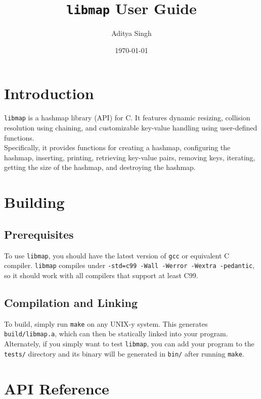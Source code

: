 \documentclass[titlepage]{article}
\title{\texttt{libmap} User Guide}
\author{Aditya Singh}
\date{\today}
\begin{document}
\maketitle
\tableofcontents
\newpage

\section{Introduction}
\texttt{libmap} is a hashmap library (API) for C. It features dynamic resizing, collision resolution using chaining,
and customizable key-value handling using user-defined functions.\\
Specifically, it provides functions for
creating a hashmap, configuring the hashmap, inserting, printing, retrieving key-value pairs, removing keys, iterating,
getting the size of the hashmap, and destroying the hashmap.
\\
\section{Building}
\subsection{Prerequisites}
To use \texttt{libmap}, you should have the latest version of
\texttt{gcc} or equivalent C compiler. \texttt{libmap} compiles under
\texttt{-std=c99 -Wall -Werror -Wextra -pedantic}, so it should work with all
compilers that support at least C99.

\subsection{Compilation and Linking}
To build, simply run \texttt{make} on any UNIX-y system. This generates
\texttt{build/libmap.a}, which can then be statically linked into your
program. Alternately, if you simply want to test \texttt{libmap}, you
can add your program to the \texttt{tests/} directory and its binary
will be generated in \texttt{bin/} after running \texttt{make}.

\newpage
\section{API Reference}
\end{document}
